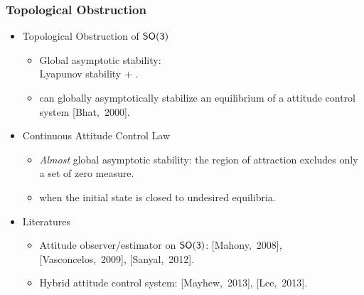 \begin{frame} %
\frametitle{Topological Obstruction}
\begin{itemize} 
\item Topological Obstruction of $\mathsf{SO(3)}$
	\begin{itemize} 
	\item Global asymptotic stability: \\ Lyapunov stability + . 	
	\vspace*{0.05cm} 
	\item {} can globally asymptotically stabilize an equilibrium of a attitude control system	[Bhat,~2000].
	\end{itemize} 
	\vspace*{0.2cm}	
\item Continuous Attitude Control Law
	\begin{itemize}
	\item \textit{Almost} global asymptotic stability: the region of attraction excludes only a set of zero measure. 
	\vspace*{0.05cm} 
	\item {} when the initial state is closed to undesired equilibria.
	\end{itemize} 	
\pause	
	\vspace*{0.2cm}	
	\item Literatures
		\begin{itemize} 
		\item Attitude observer/estimator on $\mathsf{SO(3)}$: [Mahony,~2008], [Vasconcelos,~2009], [Sanyal,~2012].
		\vspace*{0.05cm} 
		\item Hybrid attitude control system: [Mayhew,~2013], [Lee,~2013].
		\end{itemize}
	
\end{itemize}	
\end{frame}   %




